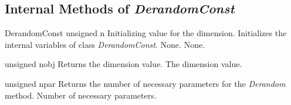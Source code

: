 \clearpage

\subsection{Internal Methods of {\em DerandomConst}}

\setNormalInstance
\printMethodWithOneParam
{}
{DerandomConst}
{unsigned}
{n}
{Initializing value for the dimension.}
{Initializes the internal variables of class {\em DerandomConst}.}
{None.}
{None.}

\vspace*{4ex}

\setNormalInstance
\printEmptyMethodReturn
{unsigned}
{nobj}
{Returns the dimension value.}
{The dimension value.}

\vspace*{4ex}

\setNormalInstance
\printEmptyMethodReturn
{unsigned}
{npar}
{Returns the number of necessary parameters for the {\em Derandom} method.}
{Number of necessary parameters.}





